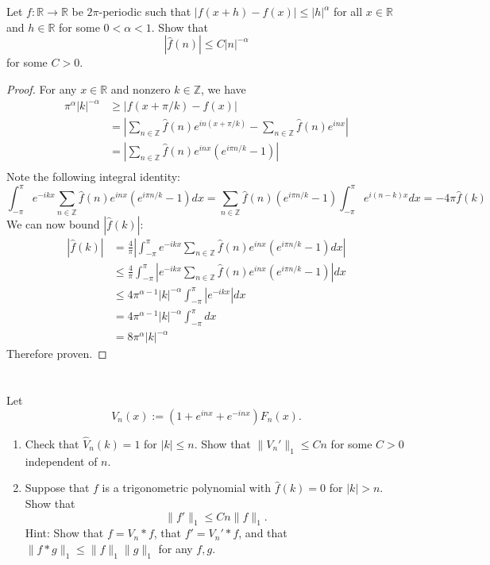 \documentclass{article}
\newcommand{\Z}{\mathbb{Z}}
\newcommand{\R}{\mathbb{R}}
\theoremstyle{definition} %
\numberwithin{thm}{section} %
\theoremstyle{definition} %
\begin{document}
\section{}

Let $f: \mathbb{R} \to \mathbb{R}$ be $2\pi$-periodic such that $|f(x+h) - f(x)| \leq |h|^\alpha$ for all $x \in \mathbb{R}$ and $h \in \mathbb{R}$ for some $0 < \alpha < 1$. Show that
\[
|\hat{f}(n)| \leq C |n|^{-\alpha}
\]
for some $C > 0$.

\begin{proof}
For any $x \in \R$ and nonzero $k \in \Z$, we have
\begin{align*}
    \pi^\alpha|k|^{-\alpha}
    &\geq |f(x + \pi/k) -  f(x)| \\ 
    &= \left|\sum_{n \in \Z}\hat{f}(n)e^{in(x + \pi/k)}
    - \sum_{n \in \Z}\hat{f}(n)e^{inx}\right| \\
    &= \left|\sum_{n \in \Z}\hat{f}(n)e^{inx}
    \left(e^{i\pi n/k} - 1\right)\right| \\
\end{align*}
Note the following integral identity:
\[
    \int_{-\pi}^\pi e^{-ikx}\sum_{n \in \Z}\hat{f}(n)e^{inx}
    \left(e^{i\pi n/k} - 1\right)dx
    = \sum_{n \in \Z}\hat{f}(n)\left(e^{i\pi n/k} - 1\right)
    \int_{-\pi}^\pi e^{i(n - k)x}dx = -4\pi\hat{f}(k)
\]
We can now bound $|\hat{f}(k)|$:
\begin{align*}
    |\hat{f}(k)|
    &= \frac{4}{\pi}
    \left|\int_{-\pi}^\pi e^{-ikx}\sum_{n \in \Z}\hat{f}(n)e^{inx}
    \left(e^{i\pi n/k} - 1\right)dx\right| \\
    &\leq \frac{4}{\pi}
    \int_{-\pi}^\pi \left|e^{-ikx}\sum_{n \in \Z}\hat{f}(n)e^{inx}
    \left(e^{i\pi n/k} - 1\right)\right|dx \\
    &\leq 4\pi^{\alpha - 1}|k|^{-\alpha}
    \int_{-\pi}^\pi \left|e^{-ikx}\right|dx \\
    &= 4\pi^{\alpha - 1}|k|^{-\alpha}
    \int_{-\pi}^\pi dx \\
    &= 8\pi^{\alpha}|k|^{-\alpha}
\end{align*}
Therefore proven.
\end{proof}


\section{}

Let
\[
V_n(x) := (1 + e^{inx} + e^{-inx}) F_n(x).
\]
\begin{enumerate}[label=(\alph*)]
\item Check that $\hat{V}_n(k) = 1$ for $|k| \leq n$. Show that $\|V_n'\|_1 \leq Cn$ for some $C > 0$ independent of $n$.

\item Suppose that $f$ is a trigonometric polynomial with $\hat{f}(k) = 0$ for $|k| > n$. Show that
\[
\|f'\|_1 \leq Cn \|f\|_1.
\]
Hint: Show that $f = V_n * f$, that $f' = V_n' * f$, and that $\|f * g\|_1 \leq \|f\|_1 \|g\|_1$ for any $f, g$.
\end{enumerate}
\end{document}
